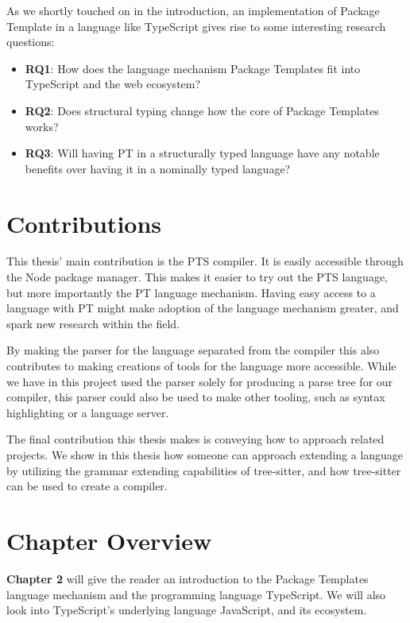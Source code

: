 As we shortly touched on in the introduction, an implementation of Package Template in a language like TypeScript gives rise to some interesting research questions:

\begin{itemize}
    \item \textbf{RQ1}: How does the language mechanism Package Templates fit into TypeScript and the web ecosystem?
    \item \textbf{RQ2}: Does structural typing change how the core of Package Templates works?
    \item \textbf{RQ3}: Will having PT in a structurally typed language have any notable benefits over having it in a nominally typed language?
\end{itemize}

\section{Contributions}\label{sec:contributions}

This thesis' main contribution is the PTS compiler.
It is easily accessible through the Node package manager.
This makes it easier to try out the PTS language, but more importantly the PT language mechanism.
Having easy access to a language with PT might make adoption of the language mechanism greater, and spark new research within the field.

By making the parser for the language separated from the compiler this also contributes to making creations of tools for the language more accessible.
While we have in this project used the parser solely for producing a parse tree for our compiler, this parser could also be used to make other tooling, such as syntax highlighting or a language server.

The final contribution this thesis makes is conveying how to approach related projects.
We show in this thesis how someone can approach extending a language by utilizing the grammar extending capabilities of tree-sitter, and how tree-sitter can be used to create a compiler.

\section{Chapter Overview}\label{sec:chapter-overview}


\textbf{Chapter 2} will give the reader an introduction to the Package Templates language mechanism and the programming language TypeScript.
We will also look into TypeScript's underlying language JavaScript, and its ecosystem.

